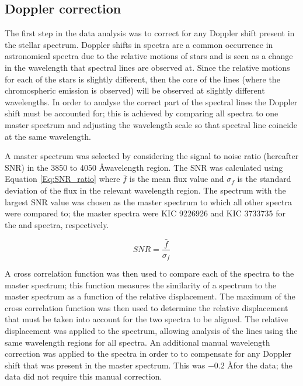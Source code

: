 \subsection{Doppler correction}
\label{Chp4_data_analysis_doppler}
The first step in the data analysis was to correct for any Doppler shift present in the stellar spectrum. Doppler shifts in spectra are a common occurrence in astronomical spectra due to the relative motions of stars and is seen as a change in the wavelength that spectral lines are observed at. Since the relative motions for each of the stars is slightly different, then the core of the \caII lines (where the chromospheric emission is observed) will be observed at slightly different wavelengths. In order to analyse the correct part of the spectral lines the Doppler shift must be accounted for; this is achieved by comparing all spectra to one master spectrum and adjusting the wavelength scale so that spectral line coincide at the same wavelength.

A master spectrum was selected by considering the signal to noise ratio (hereafter SNR) in the 3850 to 4050 \AA \space wavelength region. The SNR was calculated using Equation \ref{Eq:SNR_ratio} where $\bar{f}$ is the mean flux value and $\sigma_{f}$ is the standard deviation of the flux in the relevant wavelength region. The spectrum with the largest SNR value was chosen as the master spectrum to which all other spectra were compared to; the master spectra were KIC 9226926 and KIC 3733735 for the \narval and \esp spectra, respectively.

\begin{equation}
SNR = \frac{\bar{f}}{\sigma_{f}}
\label{Eq:SNR_ratio}
\end{equation}

A cross correlation function was then used to compare each of the spectra to the master spectrum; this function measures the similarity of a spectrum to the master spectrum as a function of the relative displacement. The maximum of the cross correlation function was then used to determine the relative displacement that must be taken into account for the two spectra to be aligned. The relative displacement was applied to the spectrum, allowing analysis of the \caII lines using the same wavelength regions for all spectra. An additional manual wavelength correction was applied to the spectra in order to to compensate for any Doppler shift that was present in the master spectrum. This was $-0.2$ \AA \space for the \esp data; the \narval data did not require this manual correction.

